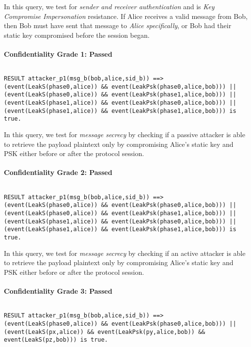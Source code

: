 In this query, we test for \emph{sender and receiver authentication} and is \emph{Key Compromise Impersonation} resistance. If Alice receives a valid message from Bob, then Bob must have sent that message to \emph{Alice specifically}, or Bob had their static key compromised before the session began.


\paragraph{Confidentiality Grade 1: Passed}$ $
\begin{lstlisting}
RESULT attacker_p1(msg_b(bob,alice,sid_b)) ==> (event(LeakS(phase0,alice)) && event(LeakPsk(phase0,alice,bob))) || (event(LeakS(phase0,alice)) && event(LeakPsk(phase1,alice,bob))) || (event(LeakS(phase1,alice)) && event(LeakPsk(phase0,alice,bob))) || (event(LeakS(phase1,alice)) && event(LeakPsk(phase1,alice,bob))) is true.
\end{lstlisting}

In this query, we test for \emph{message secrecy} by checking if a passive attacker is able to retrieve the payload plaintext only by compromising Alice's static key and PSK either before or after the protocol session.


\paragraph{Confidentiality Grade 2: Passed}$ $
\begin{lstlisting}
RESULT attacker_p1(msg_b(bob,alice,sid_b)) ==> (event(LeakS(phase0,alice)) && event(LeakPsk(phase0,alice,bob))) || (event(LeakS(phase0,alice)) && event(LeakPsk(phase1,alice,bob))) || (event(LeakS(phase1,alice)) && event(LeakPsk(phase0,alice,bob))) || (event(LeakS(phase1,alice)) && event(LeakPsk(phase1,alice,bob))) is true.
\end{lstlisting}

In this query, we test for \emph{message secrecy} by checking if an active attacker is able to retrieve the payload plaintext only by compromising Alice's static key and PSK either before or after the protocol session.


\paragraph{Confidentiality Grade 3: Passed}$ $
\begin{lstlisting}
RESULT attacker_p1(msg_b(bob,alice,sid_b)) ==> (event(LeakS(phase0,alice)) && event(LeakPsk(phase0,alice,bob))) || (event(LeakS(px,alice)) && event(LeakPsk(py,alice,bob)) && event(LeakS(pz,bob))) is true.
\end{lstlisting}

